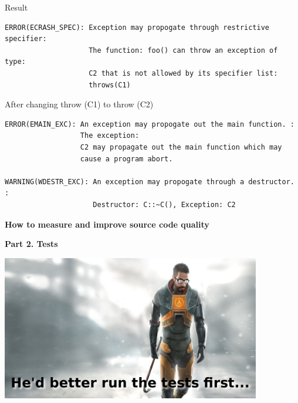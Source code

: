 \documentclass{beamer}
\begin{document}
\begin{frame}[fragile]
\begin{exampleblock}{Result}
\begin{Verbatim}[fontsize=\footnotesize]
ERROR(ECRASH_SPEC): Exception may propogate through restrictive specifier:
                    The function: foo() can throw an exception of type: 
                    C2 that is not allowed by its specifier list: 
                    throws(C1)
\end{Verbatim}
\end{exampleblock}
\begin{exampleblock}{After changing throw (C1) to throw (C2)}
\begin{Verbatim}[fontsize=\footnotesize]
ERROR(EMAIN_EXC): An exception may propogate out the main function. :
                  The exception: 
                  C2 may propagate out the main function which may 
                  cause a program abort.

WARNING(WDESTR_EXC): An exception may propogate through a destructor. :
                     Destructor: C::~C(), Exception: C2
\end{Verbatim}
\end{exampleblock}
\end{frame}

\begin{frame}
\begin{block}{\begin{center}\Large\textbf{How to measure and improve source code quality}\end{center}}
\begin{center}
\textbf{Part 2. Tests}
\end{center}
\end{block}
\begin{center}
\includegraphics[width=0.85\textwidth]{img/freeman}
\end{center}
\end{frame}
\end{document}
